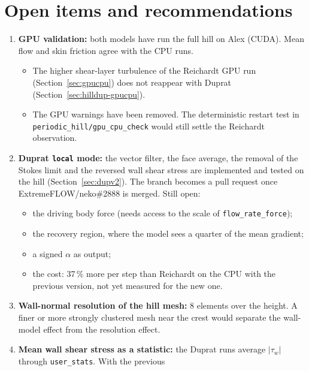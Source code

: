 \documentclass[11pt,a4paper]{article}
\newcommand{\code}[1]{\texttt{#1}}
\begin{document}
\section{Open items and recommendations}
\label{sec:open}

\begin{enumerate}
  \item \textbf{GPU validation:} both models have run the full hill on
    Alex (CUDA). Mean flow and skin friction agree with the CPU runs.
    \begin{itemize}
      \item The higher shear-layer turbulence of the Reichardt GPU run
        (Section~\ref{sec:gpucpu}) does not reappear with Duprat
        (Section~\ref{sec:hilldup-gpucpu}).
      \item The GPU warnings have been removed. The deterministic restart
        test in \code{periodic\_hill/gpu\_cpu\_check} would still settle the
        Reichardt observation.
    \end{itemize}
  \item \textbf{Duprat \code{local} mode:} the vector filter, the face
    average, the removal of the Stokes limit and the reversed wall shear
    stress are implemented and tested on the hill (Section~\ref{sec:dupv2}).
    The branch becomes a pull request once ExtremeFLOW/neko\#2888 is
    merged. Still open:
    \begin{itemize}
      \item the driving body force (needs access to the scale of
        \code{flow\_rate\_force});
      \item the recovery region, where the model sees a quarter of the
        mean gradient;
      \item a signed $\alpha$ as output;
      \item the cost: 37\,\% more per step than Reichardt on the CPU with
        the previous version, not yet measured for the new one.
    \end{itemize}
  \item \textbf{Wall-normal resolution of the hill mesh:} 8 elements over the
    height. A finer or more strongly clustered mesh near the crest would
    separate the wall-model effect from the resolution effect.
  \item \textbf{Mean wall shear stress as a statistic:} the Duprat runs
    average $|\tau_w|$ through \code{user\_stats}. With the previous

\end{enumerate}
\end{document}
